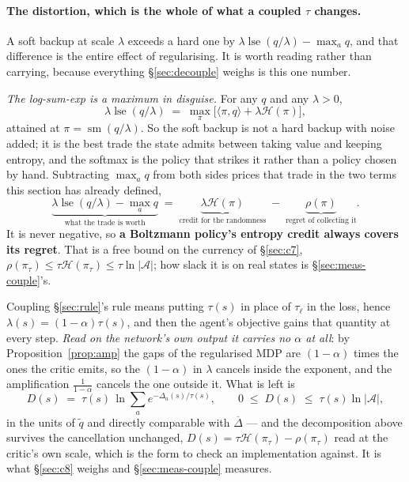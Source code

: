 \documentclass{article}
\newcommand{\actions}{\mathcal{A}}
\newcommand{\h}{\mathcal{H}}
\DeclareMathOperator{\sm}{sm}
\DeclareMathOperator{\lse}{lse}
\newcommand{\gap}{\Delta}
\newcommand{\gapbar}{\overline{\Delta}}
\newcommand{\ip}[2]{\langle #1, #2 \rangle}
\begin{document}
\paragraph{The distortion, which is the whole of what a coupled $\tau$ changes.} A soft backup at
scale $\lambda$ exceeds a hard one by $\lambda\lse(q/\lambda) - \max_a q$, and that difference is
the entire effect of regularising. It is worth reading rather than carrying, because everything
\S\ref{sec:decouple} weighs is this one number.

\emph{The log-sum-exp is a maximum in disguise.} For any $q$ and any $\lambda > 0$,
\[
  \lambda\lse(q/\lambda) \;=\; \max_{\pi}\big[\ip{\pi}{q} + \lambda\h(\pi)\big],
\]
attained at $\pi = \sm(q/\lambda)$. So the soft backup is not a hard backup with noise added; it
is the best trade the state admits between taking value and keeping entropy, and the softmax is
the policy that strikes it rather than a policy chosen by hand. Subtracting $\max_a q$ from both
sides prices that trade in the two terms this section has already defined,
\[
  \underbrace{\lambda\lse(q/\lambda) - \max_a q}_{\text{what the trade is worth}}
  \;=\; \underbrace{\lambda\h(\pi)}_{\text{credit for the randomness}}
  \;-\; \underbrace{\rho(\pi)}_{\text{regret of collecting it}} .
\]
It is never negative, so \textbf{a Boltzmann policy's entropy credit always covers its regret}.
That is a free bound on the currency of \S\ref{sec:c7}, $\rho(\pi_\tau) \le \tau\h(\pi_\tau)
\le \tau\ln|\actions|$; how slack it is on real states is \S\ref{sec:meas-couple}'s.

Coupling \S\ref{sec:rule}'s rule means putting $\tau(s)$
in place of $\tau_\ell$ in the loss, hence $\lambda(s) = (1-\alpha)\tau(s)$, and then the agent's
objective gains that quantity at every step. \emph{Read on the network's own output it carries no
$\alpha$ at all}: by Proposition~\ref{prop:amp} the gaps of the regularised MDP are $(1-\alpha)$
times the ones the critic emits, so the $(1-\alpha)$ in $\lambda$ cancels inside the exponent,
and the amplification $\frac{1}{1-\alpha}$ cancels the one outside it. What is left is
\begin{equation}
  D(s) \;=\; \tau(s)\,\ln\sum_a e^{-\gap_a(s)/\tau(s)},
  \qquad 0 \;\le\; D(s) \;\le\; \tau(s)\ln|\actions|,
  \label{eq:distortion}
\end{equation}
in the units of $\tilde{q}$ and directly comparable with $\gapbar$ --- and the decomposition above
survives the cancellation unchanged, $D(s) = \tau\h(\pi_\tau) - \rho(\pi_\tau)$ read at the
critic's own scale, which is the form to check an implementation against. It is what
\S\ref{sec:c8} weighs and \S\ref{sec:meas-couple} measures.
\end{document}
